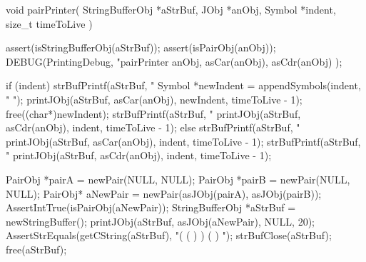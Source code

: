\startCCode
void pairPrinter(
  StringBufferObj *aStrBuf,
  JObj            *anObj,
  Symbol          *indent,
  size_t           timeToLive
) {
  assert(isStringBufferObj(aStrBuf));
  assert(isPairObj(anObj));
  DEBUG(PrintingDebug, "pairPrinter %
    anObj, asCar(anObj), asCdr(anObj) );
  
  if (indent) {
    strBufPrintf(aStrBuf, "%
    Symbol *newIndent = appendSymbols(indent, "  ");
    printJObj(aStrBuf, asCar(anObj), newIndent, timeToLive - 1);
    free((char*)newIndent);
    strBufPrintf(aStrBuf, "%
    printJObj(aStrBuf, asCdr(anObj), indent, timeToLive - 1);
  } else {
    strBufPrintf(aStrBuf, "%
    printJObj(aStrBuf, asCar(anObj), indent, timeToLive - 1);
    strBufPrintf(aStrBuf, "%
    printJObj(aStrBuf, asCdr(anObj), indent, timeToLive - 1);
  }
  
}
\stopCCode


\startCTest
  PairObj *pairA = newPair(NULL, NULL);
  PairObj *pairB = newPair(NULL, NULL);
  PairObj* aNewPair = newPair(asJObj(pairA), asJObj(pairB));
  AssertIntTrue(isPairObj(aNewPair));
  StringBufferObj *aStrBuf = newStringBuffer();
  printJObj(aStrBuf, asJObj(aNewPair), NULL, 20);
  AssertStrEquals(getCString(aStrBuf), "( (  )  ) (  )  ");
  strBufClose(aStrBuf);
  free(aStrBuf);
\stopCTest
\stopTestCase
\stopTestSuite

